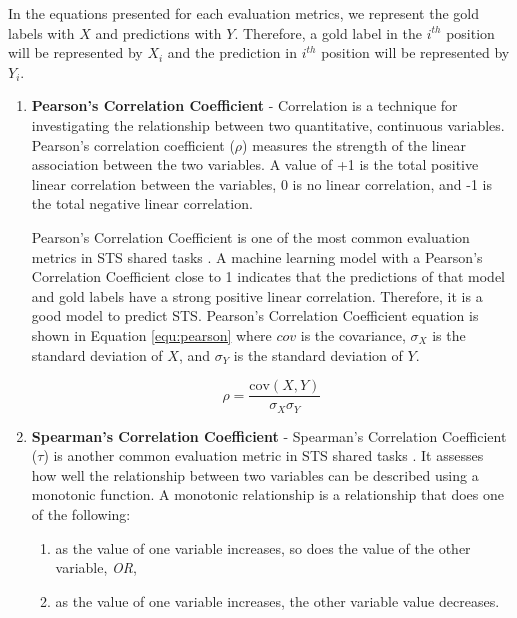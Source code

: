 In the equations presented for each evaluation metrics, we represent the gold labels with $X$ and predictions with $Y$. Therefore, a gold label in the $i^{th}$ position will be represented by $X_i$ and the prediction in $i^{th}$ position will be represented by $Y_i$. 

\begin{enumerate}
	
	\item \textbf{Pearson's Correlation Coefficient} - Correlation is a technique for investigating the relationship between two quantitative, continuous variables. Pearson's correlation coefficient ($\rho$) measures the strength of the linear association between the two variables. A value of +1 is the total positive linear correlation between the variables, 0 is no linear correlation, and -1 is the total negative linear correlation. 
	
	Pearson's Correlation Coefficient is one of the most common evaluation metrics in STS shared tasks \autocite{marelli-etal-2014-semeval,agirre-etal-2012-semeval,agirre-etal-2013-sem,agirre-etal-2014-semeval,agirre-etal-2015-semeval,agirre-etal-2016-semeval}. A machine learning model with a Pearson's Correlation Coefficient close to 1 indicates that the predictions of that model and gold labels have a strong positive linear correlation. Therefore, it is a good model to predict STS. Pearson's Correlation Coefficient equation is shown in Equation \ref{equ:pearson} where $cov$  is the covariance, $\sigma_X$ is the standard deviation of $X$, and $\sigma_Y$ is the standard deviation of $Y$.
	
	\begin{equation}
	\label{equ:pearson}
	\rho = \frac{\text{cov}(X,Y)}{\sigma_X \sigma_Y}
	\end{equation}
	
	\item \textbf{Spearman's Correlation Coefficient} - Spearman's Correlation Coefficient ($\tau$) is another common evaluation metric in STS shared tasks \autocite{marelli-etal-2014-semeval,agirre-etal-2012-semeval,agirre-etal-2013-sem,agirre-etal-2014-semeval,agirre-etal-2015-semeval,agirre-etal-2016-semeval}. It assesses how well the relationship between two variables can be described using a monotonic function. A monotonic relationship is a relationship that does one of the following: 
	
	\begin{enumerate}
		\item as the value of one variable increases, so does the value of the other variable, \textit{OR},
		\item as the value of one variable increases, the other variable value decreases.
	\end{enumerate}
	

\end{enumerate}

